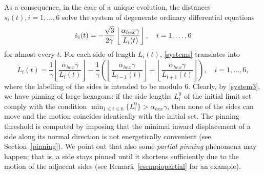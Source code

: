 \documentclass{interact}
\numberwithin{equation}{section}
\theoremstyle{definition}
\begin{document}
As a consequence, in the case of a unique evolution, the distances $s_i(t), i=1,\dots,6$ %
solve the system of degenerate ordinary differential equations
\begin{equation}\label{systems}
\dot{s}_i(t)=-{\sqrt3\over 2\gamma}\left\lfloor\frac{\alpha_{hex}\gamma}{L_{i}(t)}\right\rfloor, \quad i=1,\dots,6
\end{equation}
for almost every $t$. For each side of length $L_i(t)$, \eqref{systems} translates into
\begin{equation}\label{system3}
\dot{L}_i(t)=\frac{1}{\gamma}\left\lfloor\frac{\alpha_{hex}\gamma}{L_{i}(t)}\right\rfloor-\frac{1}{\gamma}\left(\left\lfloor\frac{\alpha_{hex}\gamma}{L_{i-1}(t)}\right\rfloor+\left\lfloor\frac{\alpha_{hex}\gamma}{L_{i+1}(t)}\right\rfloor\right),\quad i=1,\dots,6,
\end{equation}
where the labelling of the sides is intended to be modulo 6.
%
Clearly, by \eqref{system3}, we have pinning of large hexagons: if the side lengths $L_i^0$ of the initial limit set comply with the condition $\displaystyle\min_{1\leq i\leq6}\{L_i^0\}>\displaystyle\alpha_{hex}\gamma$, then none of the sides can move and the motion coincides identically with the initial set. The pinning threshold is computed by imposing that the minimal inward displacement of a side along its normal direction is not energetically convenient (see Section~\ref{pinning}). We point out that also some \emph{partial pinning} phenomena may happen; that is,  %
a side stays pinned until it shortens sufficiently due to the motion of the adjacent sides (see Remark~\ref{esempiopartial} for an example).
\end{document}
